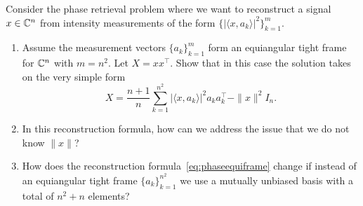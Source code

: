 \begin{myexercise}
Consider the phase retrieval problem where we want to reconstruct a signal $x\in \mathbb{C}^n$ from intensity measurements of the form $\{|\langle x,a_k \rangle|^2\}_{k=1}^m$.
\begin{enumerate}[label=(\alph*)]
\item Assume the measurement vectors $\{a_k\}_{k=1}^m$ form an equiangular tight frame for $\mathbb{C}^n$ with $m=n^2$. 
Let $X=x x^\top$. Show that in this case the solution takes on the very simple form
\begin{equation}\label{eq:phaseequiframe}
X = \frac{n+1}{n} \sum_{k=1}^{n^2} |\langle x,a_k \rangle|^2 a_k a_k^\top - \|x\|^2 I_n.
\end{equation}
\item In this reconstruction formula, how can we address the issue that we do not know $\|x\|$?
\item How does the reconstruction formula~\eqref{eq:phaseequiframe}
change if instead of an equiangular tight frame $\{a_k\}_{k=1}^{n^2}$ we use a mutually unbiased basis with a total of $n^2+n$ elements?
\end{enumerate}

\end{myexercise}

    


    

    
